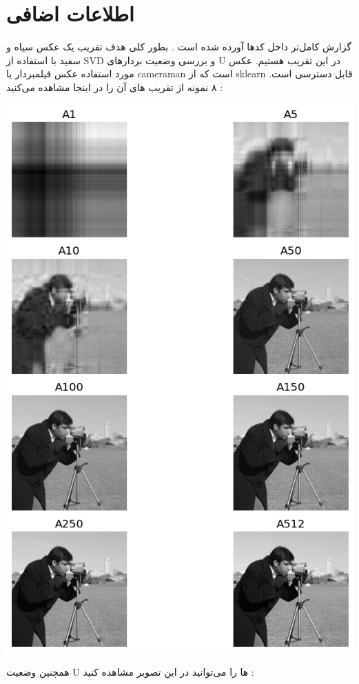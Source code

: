 \documentclass[a4paper, 12pt]{article}
\begin{document}
	\section*{اطلاعات اضافی}
	گزارش کامل‌تر داخل کد‌‌ها آورده شده است . بطور کلی هدف تقریب یک عکس سیاه و سفید با استفاده از SVD و بررسی وضعیت بردار‌های U در این تقریب هستیم. عکس مورد استفاده عکس فیلمبردار یا cameraman است که از sklearn قابل دسترسی است. ۸ نمونه از تقریب های آن را در اینجا مشاهده می‌کنید :
	\begin{center}
		\includegraphics[scale=0.5]{fig1.png}
	\end{center}
	همچنین وضعیت U ها را می‌توانید در این تصویر مشاهده کنید :
\end{document}
